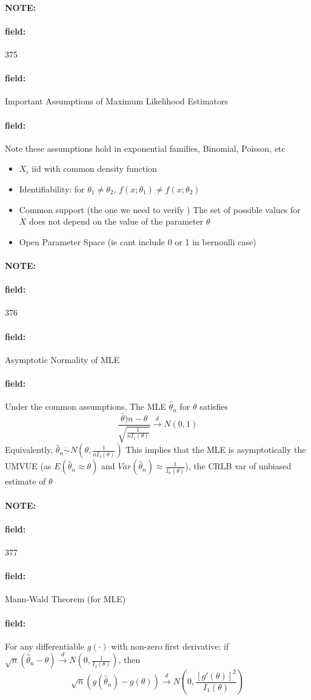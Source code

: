 \documentclass[12pt]{article}
\newenvironment{note}{\paragraph{NOTE:}}{}
\newenvironment{field}{\paragraph{field:}}{}
\begin{document}
\begin{note}
    \begin{field}
        \tiny 375
    \end{field}
    \begin{field}
        Important Assumptions of Maximum Likelihood Estimators
    \end{field}
    \begin{field}
        Note these assumptions hold in exponential families, Binomial, Poisson, etc
        \begin{itemize}
          \item $X_i$ iid with common density function
          \item Identifiability: for $\theta_1 \neq \theta_2$, $f(x;\theta_1) \neq f(x;\theta_2)$
          \item Common support (the one we need to verify ) The set of possible values for $X$ does not depend on the value of the parameter $\theta$
          \item Open Parameter Space (ie cant include 0 or 1 in bernoulli case)
        \end{itemize}
    \end{field}
\end{note}


\begin{note}
    \begin{field}
        \tiny 376
    \end{field}
    \begin{field}
        Asymptotic Normality of MLE
    \end{field}
    \begin{field}
        Under the common assumptions, The MLE $\hat{\theta}_n$ for $\theta$ satisfies
        $$ \frac{\hat{\theta})n -\theta}{\sqrt{\frac{1}{n I_1(\theta)}}} \overset{d}{\to} N(0,1)$$
        Equivalently,
        $\hat{\theta}_n \dot\sim N(\theta, \frac{1}{nI_1(\theta)})$
        This implies that the MLE is asymptotically the UMVUE (as $E(\hat{\theta}_n \approx \theta)$ and $Var(\hat{\theta}_n) \approx \frac{1}{I_n(\theta)}$), the CRLB var of unbiased estimate of $\theta$
    \end{field}
\end{note}


\begin{note}
    \begin{field}
        \tiny 377
    \end{field}
    \begin{field}
        Mann-Wald Theorem (for MLE)
    \end{field}
    \begin{field}
        For any differentiable $g(\cdot)$ with non-zero first derivative:
        if $\sqrt{n}(\hat{\theta}_n - \theta) \overset{d}{\to} N(0, \frac{1}{I_1(\theta)})$, then
        $$\sqrt{n}(g(\hat{\theta}_n) - g(\theta)) \overset{d}{\to} N(0,\frac{[g'(\theta)]^2}{I_1(\theta)}) $$
    \end{field}
\end{note}
\end{document}
